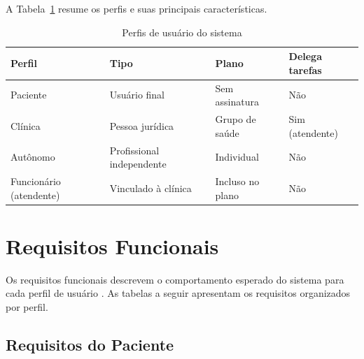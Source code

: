 A Tabela~\ref{tab:profiles} resume os perfis e suas
principais características.

\begin{table}[H]
  \centering
  \caption{Perfis de usuário do sistema}
  \label{tab:profiles}
  \begin{tabular}{p{2.8cm}p{3cm}p{3cm}p{2.8cm}}
    \toprule
    \textbf{Perfil} &
    \textbf{Tipo} &
    \textbf{Plano} &
    \textbf{Delega tarefas} \\
    \midrule
    Paciente
      & Usuário final
      & Sem assinatura
      & Não \\
    Clínica
      & Pessoa jurídica
      & Grupo de saúde
      & Sim (atendente) \\
    Autônomo
      & Profissional independente
      & Individual
      & Não \\
    Funcionário (atendente)
      & Vinculado à clínica
      & Incluso no plano
      & Não \\
    \bottomrule
  \end{tabular}
\end{table}

\section{Requisitos Funcionais}
\label{sec:functional-requirements}

Os requisitos funcionais descrevem o comportamento
esperado do sistema para cada perfil de usuário
\cite{sommerville2011}. As tabelas a seguir
apresentam os requisitos organizados por perfil.

\subsection{Requisitos do Paciente}
\label{subsec:patient-requirements}

